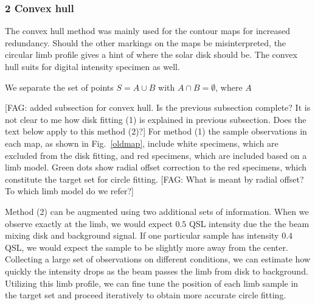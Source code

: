 \documentclass{aa}
\newcommand{\fag}[1]{\textcolor{midpurple}{[FAG: #1]}} %
\begin{document}
  \subsubsection{2 Convex hull}\label{sect:convex-hull}

  The convex hull method was mainly used for the contour maps for increased redundancy. Should the other markings on the 
  maps be misinterpreted, the circular limb profile gives a hint of where the solar disk should be. The convex hull 
  suits for digital intensity specimen as well.

  We separate the set of points $S = A \cup B$ with $A \cap B = \emptyset$, where $A$ 


  \fag{added subsection for convex hull. Is the previous subsection complete?
  It is not clear to me how disk fitting (1) is explained in previous
  subsection.
  Does the text below apply to this method (2)?}
  For method (1) the sample observations in each map, as shown in
  Fig.~\ref{oldmap}, include white specimens, which are excluded from the disk
  fitting, and red specimens, which are included based on a limb model.
  Green dots show radial offset correction to the red specimens, which constitute
  the target set for circle fitting.
  \fag{What is meant by radial offset? To which limb model do we refer?}


  Method (2) can be augmented using two additional sets of information.
  When we observe exactly at the limb, we would expect $0.5$ QSL intensity
  due the the beam mixing disk and background signal.
  If one particular sample has intensity $0.4$ QSL, we would expect the
  sample to be slightly more away from the center.
  Collecting a large set of observations on different conditions, we can
  estimate how quickly the intensity drops as the beam passes the limb 
  from disk to background.
  Utilizing this limb profile, we can fine tune the position of each limb
  sample in the target set and proceed iteratively to obtain more
  accurate circle fitting.
  
\end{document}

